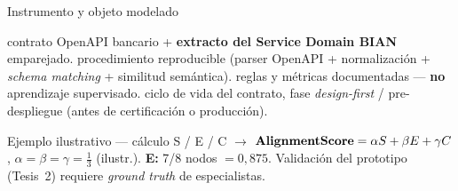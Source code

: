 \documentclass[aspectratio=169,11pt,spanish]{beamer}
\begin{document}
\begin{frame}{Instrumento y objeto modelado}
  \vspace{0.12em}
  \begin{planpanel}
  \small
   contrato OpenAPI bancario + \textbf{extracto del Service Domain BIAN} emparejado.  procedimiento reproducible (parser OpenAPI + normalización + \textit{schema matching} + similitud semántica).  reglas y métricas documentadas --- \textbf{no} aprendizaje supervisado.  ciclo de vida del contrato, fase \textit{design-first} / pre-despliegue (antes de certificación o producción).
  \end{planpanel}
\end{frame}

\begin{frame}{Ejemplo ilustrativo --- cálculo S / E / C $\rightarrow$ \AlignmentScore{}}
  \vspace{0.15em}
  {\footnotesize $\textbf{AlignmentScore} = \alpha S + \beta E + \gamma C$, $\alpha=\beta=\gamma=\frac{1}{3}$ (ilustr.). \textbf{E:} 7/8 nodos $= 0{,}875$. Validación del prototipo (Tesis~2) requiere \textit{ground truth} de especialistas.}
\end{frame}
\end{document}
